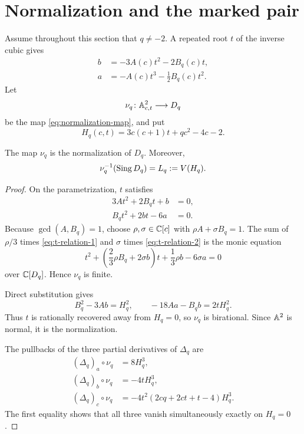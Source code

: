 \documentclass[11pt,reqno]{amsart}
\begin{document}
\section{Normalization and the marked pair}
\label{sec:normalization}

Assume throughout this section that \(q\ne-2\).  A repeated root \(t\) of
the inverse cubic gives
\begin{equation}
\label{eq:normalization-map}
\begin{aligned}
b&=-3A(c)t^2-2B_q(c)t,\\
a&=-A(c)t^3-\frac12B_q(c)t^2.
\end{aligned}
\end{equation}
Let
\[
\nu_q\colon\mathbb A^2_{c,t}\longrightarrow D_q
\]
be the map \eqref{eq:normalization-map}, and put
\begin{equation}
\label{eq:Hq}
H_q(c,t)=3c(c+1)t+qc^2-4c-2.
\end{equation}

\begin{proposition}
\label{prop:normalization}
The map \(\nu_q\) is the normalization of \(D_q\).  Moreover,
\[
\nu_q^{-1}(\operatorname{Sing} D_q)=
L_q:=V(H_q).
\]
\end{proposition}

\begin{proof}
On the parametrization, \(t\) satisfies
\begin{align}
3At^2+2B_qt+b&=0,\label{eq:t-relation-1}\\
B_qt^2+2bt-6a&=0.\label{eq:t-relation-2}
\end{align}
Because \(\gcd(A,B_q)=1\), choose
\(\rho,\sigma\in\mathbb C[c]\) with \(\rho A+\sigma B_q=1\).
The sum of \(\rho/3\) times \eqref{eq:t-relation-1} and \(\sigma\) times
\eqref{eq:t-relation-2} is the monic equation
\[
t^2+
\left(\frac23\rho B_q+2\sigma b\right)t
+\frac13\rho b-6\sigma a=0
\]
over \(\mathbb C[D_q]\).  Hence \(\nu_q\) is finite.

Direct substitution gives
\begin{equation}
\label{eq:recover-t}
B_q^2-3Ab=H_q^2,\qquad
-18Aa-B_qb=2tH_q^2.
\end{equation}
Thus \(t\) is rationally recovered away from \(H_q=0\), so \(\nu_q\) is
birational.  Since \(\mathbb A^2\) is normal, it is the normalization.

The pullbacks of the three partial derivatives of \(\Delta_q\) are
\begin{align}
(\Delta_q)_a\circ\nu_q&=8H_q^3,\label{eq:grad-a}\\
(\Delta_q)_b\circ\nu_q&=-4tH_q^3,\label{eq:grad-b}\\
(\Delta_q)_c\circ\nu_q
&=-4t^2(2cq+2ct+t-4)H_q^3.\label{eq:grad-c}
\end{align}
The first equality shows that all three vanish simultaneously exactly on
\(H_q=0\).
\end{proof}
\end{document}
